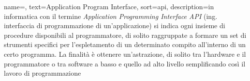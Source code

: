 


 {
    name=,
    text=Application Program Interface,
    sort=api,
    description={in informatica con il termine \emph{Application Programming Interface API} (ing. interfaccia di programmazione di un'applicazione) si indica ogni insieme di procedure disponibili al programmatore, di solito raggruppate a formare un set di strumenti specifici per l'espletamento di un determinato compito all'interno di un certo programma. La finalità è ottenere un'astrazione, di solito tra l'hardware e il programmatore o tra software a basso e quello ad alto livello semplificando così il lavoro di programmazione}
}

